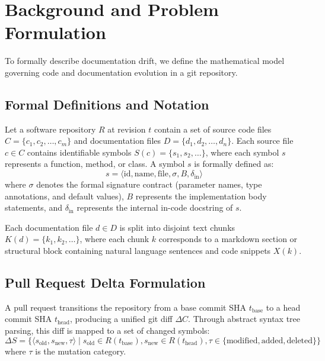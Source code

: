 \documentclass[12pt,onecolumn,draftclsnofoot]{IEEEtran}
\begin{document}
\section{Background and Problem Formulation}
To formally describe documentation drift, we define the mathematical model governing code and documentation evolution in a git repository.

\subsection{Formal Definitions and Notation}
Let a software repository $R$ at revision $t$ contain a set of source code files $C = \{c_1, c_2, \dots, c_m\}$ and documentation files $D = \{d_1, d_2, \dots, d_n\}$.
Each source file $c \in C$ contains identifiable symbols $S(c) = \{s_1, s_2, \dots\}$, where each symbol $s$ represents a function, method, or class. A symbol $s$ is formally defined as:
\begin{equation}
s = \langle \text{id}, \text{name}, \text{file}, \sigma, B, \delta_{\text{in}} \rangle
\end{equation}
where $\sigma$ denotes the formal signature contract (parameter names, type annotations, and default values), $B$ represents the implementation body statements, and $\delta_{\text{in}}$ represents the internal in-code docstring of $s$.

Each documentation file $d \in D$ is split into disjoint text chunks $K(d) = \{k_1, k_2, \dots\}$, where each chunk $k$ corresponds to a markdown section or structural block containing natural language sentences and code snippets $X(k)$.

\subsection{Pull Request Delta Formulation}
A pull request transitions the repository from a base commit SHA $t_{\text{base}}$ to a head commit SHA $t_{\text{head}}$, producing a unified git diff $\Delta C$. Through abstract syntax tree parsing, this diff is mapped to a set of changed symbols:
\begin{equation}
\Delta S = \{ \langle s_{\text{old}}, s_{\text{new}}, \tau \rangle \mid s_{\text{old}} \in R(t_{\text{base}}), s_{\text{new}} \in R(t_{\text{head}}), \tau \in \{\text{modified}, \text{added}, \text{deleted}\} \}
\end{equation}
where $\tau$ is the mutation category.
\end{document}

